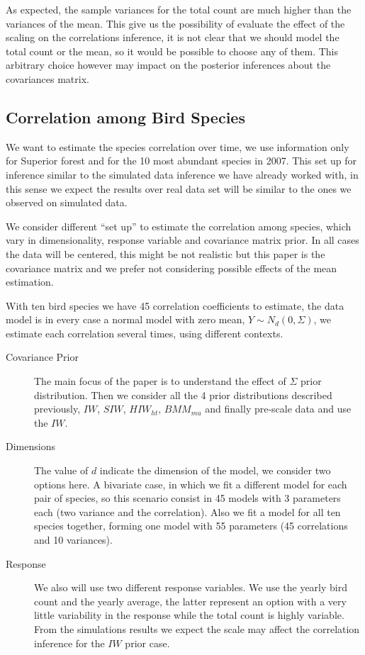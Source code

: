 \documentclass{article}
\begin{document}
As expected, the sample variances for the total count are much higher than the variances of the mean. This give us the possibility of evaluate the effect of the scaling on the correlations inference, it is not clear that we should model the total count or the mean, so it would be possible to choose any of them. This arbitrary choice however may impact on the posterior inferences about the covariances matrix. 

\subsection{ Correlation among Bird Species}

We want to estimate the species correlation over time, we use information only for Superior forest and for the 10 most abundant species in 2007. This set up for inference similar to the simulated data inference we have already worked with, in this sense we expect the results over real data set will be similar to the ones we observed on simulated data. 

We consider different ``set up'' to estimate the correlation among species, which vary in dimensionality, response variable and covariance matrix prior. In all cases the data will be centered, this might be not realistic but this paper is the covariance matrix and we prefer not considering possible effects of the mean estimation.  

With ten bird species we have 45 correlation coefficients to estimate, the data model is in every case a normal model with zero mean, $Y \sim N_d(0, \Sigma)$, we estimate each correlation several times, using different contexts. 

\begin{description}
\item[Covariance Prior] The main focus of the paper is to understand the effect of  $\Sigma$ prior distribution. Then we consider all the 4 prior distributions described previously, $IW$, $SIW$, $HIW_{ht}$, $BMM_{mu}$ and finally pre-scale data and use the $IW$. 

\item[ Dimensions] The value of $d$ indicate the dimension of the model, we consider two options here. A bivariate case, in which we fit a different model for each pair of species, so this scenario consist in 45 models with 3 parameters each (two variance and the correlation). Also we fit a model for all ten species together, forming one model with 55 parameters (45 correlations and 10 variances). 

\item[Response] We also will use two different response variables. We use the yearly bird count and the yearly average, the latter represent an option with a very little variability in the response while the total count is highly variable. From the simulations results we expect the scale may affect the correlation inference for the $IW$ prior case. 
\end{description}
\end{document}
